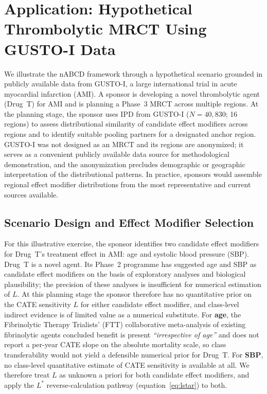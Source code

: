 \section{Application: Hypothetical Thrombolytic MRCT Using GUSTO-I Data}\label{sec:application}

We illustrate the nABCD framework through a hypothetical scenario grounded in publicly available data from GUSTO-I, a large international trial in acute myocardial infarction (AMI). A sponsor is developing a novel thrombolytic agent (Drug~T) for AMI and is planning a Phase~3 MRCT across multiple regions. At the planning stage, the sponsor uses IPD from GUSTO-I ($N = 40{,}830$; 16 regions)\cite{gusto1993} to assess distributional similarity of candidate effect modifiers across regions and to identify suitable pooling partners for a designated anchor region. GUSTO-I was not designed as an MRCT and its regions are anonymized; it serves as a convenient publicly available data source for methodological demonstration, and the anonymization precludes demographic or geographic interpretation of the distributional patterns. In practice, sponsors would assemble regional effect modifier distributions from the most representative and current sources available.

\subsection{Scenario Design and Effect Modifier Selection}\label{sec:app_scenario}

For this illustrative exercise, the sponsor identifies two candidate effect modifiers for Drug~T's treatment effect in AMI: age and systolic blood pressure (SBP). Drug~T is a novel agent. Its Phase~2 programme has suggested age and SBP as candidate effect modifiers on the basis of exploratory analyses and biological plausibility; the precision of these analyses is insufficient for numerical estimation of $L$. At this planning stage the sponsor therefore has no quantitative prior on the CATE sensitivity $L$ for either candidate effect modifier, and class-level indirect evidence is of limited value as a numerical substitute. For \textbf{age}, the Fibrinolytic Therapy Trialists' (FTT) collaborative meta-analysis of existing fibrinolytic agents\cite{ftt1994} concluded benefit is present \emph{``irrespective of age''} and does not report a per-year CATE slope on the absolute mortality scale, so class transferability would not yield a defensible numerical prior for Drug~T. For \textbf{SBP}, no class-level quantitative estimate of CATE sensitivity is available at all. We therefore treat $L$ as unknown a priori for both candidate effect modifiers, and apply the $L^*$ reverse-calculation pathway (equation~\ref{eq:lstar}) to both.

